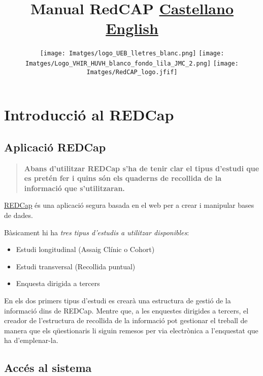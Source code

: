 \documentclass[
]{article}
\title{Manual RedCAP \href{e:/21692711P/Dropbox\%20(Nuevo\%20Equipo\%20VHIR10)/UEB/REDCap/Manuals/REDCap_CAS/introducción-al-redcap.html}{Castellano} \href{e:/21692711P/Dropbox\%20(Nuevo\%20Equipo\%20VHIR10)/UEB/REDCap/Manuals/REDCap_ANG/redcap-introduction.html}{English}}
\subtitle{\texttt{[image: Imatges/logo\_UEB\_lletres\_blanc.png]} \texttt{[image: Imatges/Logo\_VHIR\_HUVH\_blanco\_fondo\_lila\_JMC\_2.png]} \texttt{[image: Imatges/RedCAP\_logo.jfif]}}
\author{}
\date{\vspace{-2.5em}}
\providecommand{\tightlist}{%
  \setlength{\itemsep}{0pt}\setlength{\parskip}{0pt}}
\begin{document}
\maketitle

{
\setcounter{tocdepth}{2}
\tableofcontents
}
\hypertarget{introducciuxf3-al-redcap}{%
\section{\texorpdfstring{\textbf{Introducció al REDCap}}{Introducció al REDCap}}\label{introducciuxf3-al-redcap}}

\hypertarget{aplicaciuxf3-redcap}{%
\subsection{\texorpdfstring{\textbf{Aplicació REDCap}}{Aplicació REDCap}}\label{aplicaciuxf3-redcap}}

\begin{quote}
\textbf{Abans d'utilitzar REDCap s'ha de tenir clar el tipus d'estudi que es pretén fer i quins són els quaderns de recollida de la informació que s'utilitzaran.}
\end{quote}

\href{https://www.project-redcap.org}{REDCap} és una aplicació segura basada en el web per a crear i manipular bases de dades.

Bàsicament hi ha \emph{tres tipus d'estudis a utilitzar disponibles}:

\begin{itemize}
\tightlist
\item
  Estudi longitudinal (Assaig Clínic o Cohort)
\item
  Estudi transversal (Recollida puntual)
\item
  Enquesta dirigida a tercers
\end{itemize}

En els dos primers tipus d'estudi es crearà una estructura de gestió de la informació dins de REDCap. Mentre que, a les enquestes dirigides a tercers, el creador de l'estructura de recollida de la informació pot gestionar el treball de manera que els qüestionaris li siguin remesos per via electrònica a l'enquestat que ha d'emplenar-la.

\hypertarget{accuxe9s-al-sistema}{%
\subsection{\texorpdfstring{\textbf{Accés al sistema}}{Accés al sistema}}\label{accuxe9s-al-sistema}}
\end{document}
